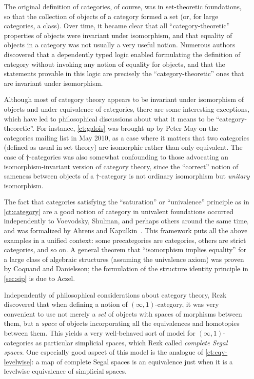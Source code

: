 \documentclass[12pt]{article}
\let\autoref\cref
\begin{document}
The original definition of categories, of course, was in set-theoretic foundations, so that the collection of objects of a category formed a set (or, for large categories, a class).
Over time, it became clear that all ``category-theoretic'' properties of objects were invariant under isomorphism, and that equality of objects in a category was not usually a very useful notion.
Numerous authors~\cite{blanc:eqv-log,freyd:invar-eqv,makkai:folds,makkai:comparing} discovered that a dependently typed logic enabled formulating the definition of category without invoking any notion of equality for objects, and that the statements provable in this logic are precisely the ``category-theoretic'' ones that are invariant under isomorphism.
%

Although most of category theory appears to be invariant under isomorphism of objects and under equivalence of categories, there are some interesting exceptions, which have led to philosophical discussions about what it means to be ``category-theoretic''.
For instance, \autoref{ct:galois} was brought up by Peter May on the categories mailing list in May 2010, as a case where it matters that two categories (defined as usual in set theory) are isomorphic rather than only equivalent.
The case of $\dagger$-categories was also somewhat confounding to those advocating an isomorphism-invariant version of category theory, since the ``correct'' notion of sameness between objects of a $\dagger$-category is not ordinary isomorphism but \emph{unitary} isomorphism.
%

The fact that categories satisfying the ``saturation'' or ``univalence'' principle as in \autoref{ct:category} are a good notion of category in univalent foundations occurred independently to Voevodsky, Shulman, and perhaps others around the same time, and was formalized by Ahrens and Kapulkin~\cite{aks:rezk}.
This framework puts all the above examples in a unified context: some precategories are categories, others are strict categories, and so on.
A general theorem that ``isomorphism implies equality'' for a large class of algebraic structures (assuming the univalence axiom) was proven by Coquand and Danielsson; the formulation of the structure identity principle in \autoref{sec:sip} is due to Aczel.

Independently of philosophical considerations about category theory, Rezk~\cite{rezk01css} discovered that when defining a notion of $(\infty,1)$-cat\-e\-go\-ry,
%
it was very convenient to use not merely a \emph{set} of objects with spaces of morphisms between them, but a \emph{space} of objects incorporating all the equivalences and homotopies between them.
This yields a very well-behaved sort of model for $(\infty,1)$-categories as particular simplicial spaces, which Rezk called \emph{complete Segal spaces}.
%
%
One especially good aspect of this model is the analogue of \autoref{ct:eqv-levelwise}: a map of complete Segal spaces is an equivalence just when it is a levelwise equivalence of simplicial spaces.
\end{document}
